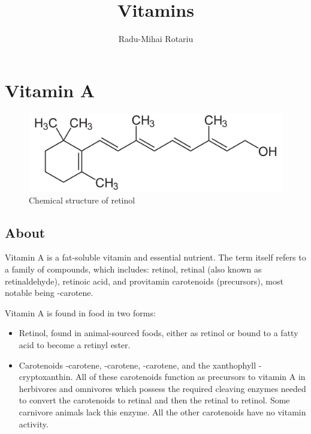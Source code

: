 \documentclass{book}
\title{Vitamins}
\author{Radu-Mihai Rotariu}
\date{}
\begin{document}
\begin{titlepage}
\maketitle
\end{titlepage}

\tableofcontents
\newpage

\begin{sloppypar}

\chapter{Vitamin A}
\begin{figure}[h]
	\caption{Chemical structure of retinol}
	\centering \includegraphics[width=\textwidth]{images/Vitamin_A_chemical_structure}
\end{figure}
\newpage

\section{About}
Vitamin A is a fat-soluble vitamin and essential nutrient. The term itself refers to a family of compounds, which includes: retinol, retinal (also known as retinaldehyde), retinoic acid, and provitamin carotenoids (precursors), most notable being \textbeta-carotene.

Vitamin A is found in food in two forms:
\begin{itemize}
	\item Retinol, found in animal-sourced foods, either as retinol or bound to a fatty acid to become a retinyl ester.
	\item Carotenoids \textalpha-carotene, \textbeta-carotene, \textgamma-carotene, and the xanthophyll \textbeta-cryptoxanthin. All of these carotenoids function as precursors to vitamin A in herbivores and omnivores which possess the required cleaving enzymes needed to convert the carotenoids to retinal and then the retinal to retinol. Some carnivore animals lack this enzyme. All the other carotenoids have no vitamin activity.
\end{itemize}


\end{sloppypar}
\end{document}
